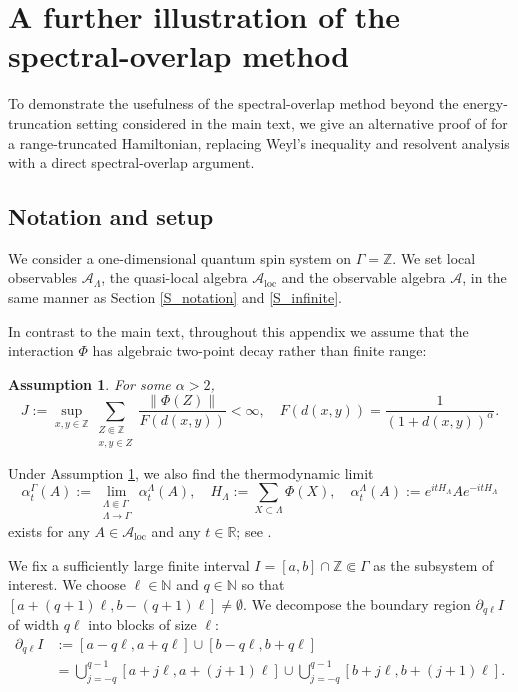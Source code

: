 \documentclass[11pt]{article}
\numberwithin{equation}{section}
\newtheorem{assumption}[theorem]{Assumption}
\begin{document}
\newpage
\section{A further illustration of the spectral-overlap method}\label{S_application}
To demonstrate the usefulness of the spectral-overlap method beyond the energy-truncation setting considered in the main text, we give an alternative proof of \cite[Lemma B.5]{Liu-Yi-Zhou-Zou2025} for a range-truncated Hamiltonian, replacing Weyl's inequality and resolvent analysis with a direct spectral-overlap argument.

\subsection{Notation and setup}
We consider a one-dimensional quantum spin system on $\Gamma=\mathbb{Z}$. We set local observables $\mathcal{A}_\Lambda$, the quasi-local algebra $\mathcal{A}_\mathrm{loc}$ and the observable algebra $\mathcal{A}$, in the same manner as Section \ref{S_notation} and \ref{S_infinite}.

In contrast to the main text, throughout this appendix we assume that the interaction $\Phi$ has algebraic two-point decay rather than finite range:

\begin{assumption}\label{ass_interaction2}
For some $\alpha>2$,
\[
J:=\sup_{x,y\in\mathbb{Z}} \sum_{\substack{Z\Subset\mathbb{Z}\\ x,y\in Z}} \frac{\|\Phi(Z)\|}{F(d(x,y))}<\infty,\quad F(d(x,y))=\frac{1}{(1+d(x,y))^\alpha}.
\]
\end{assumption}
Under Assumption \ref{ass_interaction2}, we also find the thermodynamic limit
\[
\alpha_t^\Gamma(A):=\lim_{\substack{\Lambda\Subset\Gamma\\ \Lambda\to\Gamma}}\alpha_t^\Lambda(A),\quad
H_\Lambda:=\sum_{X\subset\Lambda} \Phi(X),\quad
\alpha_t^\Lambda(A):=e^{itH_\Lambda}Ae^{-itH_\Lambda}
\]
exists for any $A\in\mathcal{A}_{\mathrm{loc}}$ and any $t\in\mathbb{R}$; see \cite[Theorem 3.5]{Nachtergaele-Sims-Young}.

\medskip
We fix a sufficiently large finite interval $I=[a,b]\cap\mathbb{Z}\Subset\Gamma$ as the subsystem of interest. We choose $\ell\in\mathbb{N}$ and $q\in\mathbb{N}$ so that $[a+(q+1)\ell,b-(q+1)\ell]\neq\emptyset$. We decompose the boundary region $\partial_{q\ell}I$ of width $q\ell$ into blocks of size $\ell$:
\begin{align*}
\partial_{q\ell} I
&:=[a-q\ell,a+q\ell]\cup[b-q\ell,b+q\ell]\\
&=\bigcup_{j=-q}^{q-1} [a+j\ell,a+(j+1)\ell]\cup 
\bigcup_{j=-q}^{q-1} [b+j\ell,b+(j+1)\ell].
\end{align*}
\end{document}

